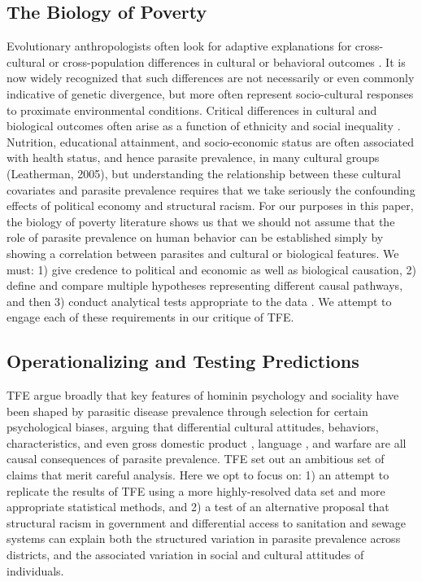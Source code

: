 \documentclass[12pt]{article}
\begin{document}
\subsection{The Biology of Poverty}
Evolutionary anthropologists often look for adaptive explanations for cross-cultural or cross-population differences in cultural or behavioral outcomes \citep{bogin2007life}.  It is now widely recognized that such differences are not necessarily or even commonly indicative of genetic divergence, but more often represent socio-cultural responses to proximate environmental conditions.  Critical differences in cultural and biological outcomes often arise as a function of ethnicity and social inequality \citep{gravlee2009race}.  Nutrition, educational attainment, and socio-economic status are often associated with health status, and hence parasite prevalence, in many cultural groups (Leatherman, 2005), but understanding the relationship between these cultural covariates and parasite prevalence requires that we take seriously the confounding effects of political economy and structural racism.  For our purposes in this paper, the biology of poverty literature shows us that we should not assume that the role of parasite prevalence on human behavior can be established simply by showing a correlation between parasites and cultural or biological features.  We must: 1) give credence to political and economic as well as biological causation, 2) define and compare multiple hypotheses representing different causal pathways, and then 3) conduct analytical tests appropriate to the data \citep{dufour2006biocultural}.  We attempt to engage each of these requirements in our critique of TFE.

	
\subsection{Operationalizing and Testing Predictions}
	TFE argue broadly that key features of hominin psychology and sociality have been shaped by parasitic disease prevalence through selection for certain psychological biases, arguing that differential cultural attitudes, behaviors, characteristics, and even gross domestic product \citep{Eppig2010}, language \citep{fincher2008parasite}, and warfare \citep{letendre2010does} are all causal consequences of parasite prevalence. TFE set out an ambitious set of claims that merit careful analysis. Here we opt to focus on: 1) an attempt to replicate the results of TFE using a more highly-resolved data set and more appropriate statistical methods, and 2) a test of an alternative proposal that structural racism in government and differential access to sanitation and sewage systems can explain both the structured variation in parasite prevalence across districts, and the associated variation in social and cultural attitudes of individuals. 
	
\end{document}
